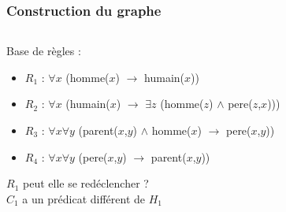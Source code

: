 \begin{frame}
	\frametitle{Construction du graphe}
	\begin{columns}
	\begin{column}{0.55\linewidth}
		Base de règles :
		\begin{itemize}
			\item $R_1$ : $\forall x$ (homme($x$) $\rightarrow$ humain($x$))
			\item $R_2$ : $\forall x$ (humain($x$) $\rightarrow$ $\exists z$ (homme($z$)
			$\wedge$ pere($z$,$x$)))
			\item $R_3$ : $\forall x \forall y$ (parent($x$,$y$) $\wedge$ homme($x$)
			$\rightarrow$ pere($x$,$y$))
			\item $R_4$ : $\forall x \forall y$ (pere($x$,$y$) $\rightarrow$
			parent($x$,$y$))
		\end{itemize}
		\vfill
		$R_1$ peut elle se redéclencher ?\\
		$C_1$ a un prédicat différent de $H_1$
	\end{column}
	\vline
	\hfill
	\begin{column}{0.35\linewidth}
		\begin{figure}
		\end{figure}
	\end{column}
	\end{columns}
\end{frame}


